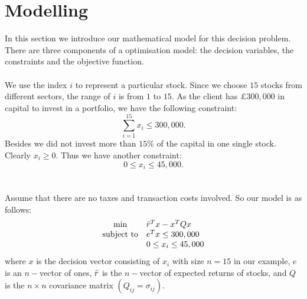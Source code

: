 
\section{Modelling}

In this section we introduce our mathematical model for this decision problem. There are three components of a optimisation model: the decision variables, the constraints and the objective function.
\\ \hspace*{\fill} \\
We use the index $i$ to represent a particular stock. Since we choose $15$ stocks from different sectors, the range of $i$ is from $1$ to $15$. As the client has $\pounds 300,000$ in capital to invest in a portfolio, we have the following constraint:
\begin{equation*}
    \sum_{i=1}^{15}x_i \leq 300,000.
\end{equation*}
Besides we did not invest more than $15\%$ of the capital in one single stock. Clearly $x_i \geq 0$. Thus we have another constraint:
\begin{equation*}
    0 \leq x_i \leq 45,000.
\end{equation*}
\\ \hspace*{\fill} \\
Assume that there are no taxes and transaction costs involved. So our model is as follows:
$$
\begin{array}{cl}
\min & \Bar{r}^{T} x - x^{T} Q x \\
\text {subject to} & e^{T} x \leq 300,000 \\
& 0 \leq x_i \leq 45,000 
\end{array}
$$
where $x$ is the decision vector consisting of $x_i$ with size $n = 15$ in our example, $e$ is an $n-$vector of ones, $\Bar{r}$ is the $n-$vector of expected returns of stocks, and $Q$ is the $n \times n$ covariance matrix $(Q_{ij} = \sigma_{ij})$.

\newpage
